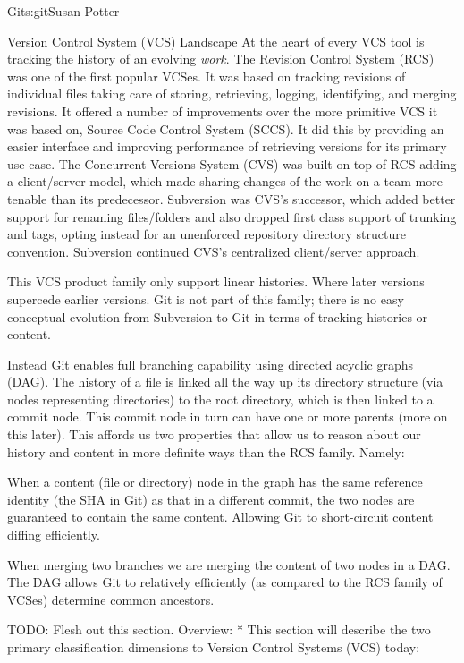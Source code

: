 \begin{aosachapter}{Git}{s:git}{Susan Potter}
\begin{aosasect1}{Version Control System (VCS) Landscape}
At the heart of every VCS tool is tracking the history of an evolving
\emph{work}. The Revision Control System (RCS) was one of the first popular
VCSes. It was based on tracking revisions of individual files taking care of
storing, retrieving, logging, identifying, and merging revisions. It offered
a number of improvements over the more primitive VCS it was based on,
Source Code Control System (SCCS). It did this by providing an easier
interface and improving performance of retrieving versions for its primary
use case. The Concurrent Versions System (CVS) was built on top of RCS adding
a client/server model, which made sharing changes of the work on a team more
tenable than its predecessor. Subversion was CVS's successor, which added
better support for renaming files/folders and also dropped first class
support of trunking and tags, opting instead for an unenforced repository
directory structure convention. Subversion continued CVS's centralized
client/server approach.

This VCS product family only support linear histories. Where later
versions supercede earlier versions. Git is not part of this family; there is
no easy conceptual evolution from Subversion to Git in terms of tracking
histories or content.

Instead Git enables full branching capability using directed acyclic
graphs (DAG). The history of a file is linked all the way
up its directory structure (via nodes representing directories) to the root
directory, which is then linked to a commit node. This commit node in turn
can have one or more parents (more on this later). This affords us two
properties that allow us to reason about our history and content in
more definite ways than the RCS family. Namely:
\begin{aosaitemize}
  \item When a content (file or directory) node in the graph has the same
  reference identity (the SHA in Git) as that in a different commit, the two
  nodes are guaranteed to contain the same content. Allowing Git to
  short-circuit content diffing efficiently.
  \item When merging two branches we are merging the content of two nodes
  in a DAG. The DAG allows Git to relatively efficiently (as compared to the
  RCS family of VCSes) determine common ancestors.
\end{aosaitemize}

TODO: Flesh out this section. Overview:
* This section will describe the two primary classification dimensions to
Version Control Systems (VCS) today:


\end{aosasect1}
\end{aosachapter}
